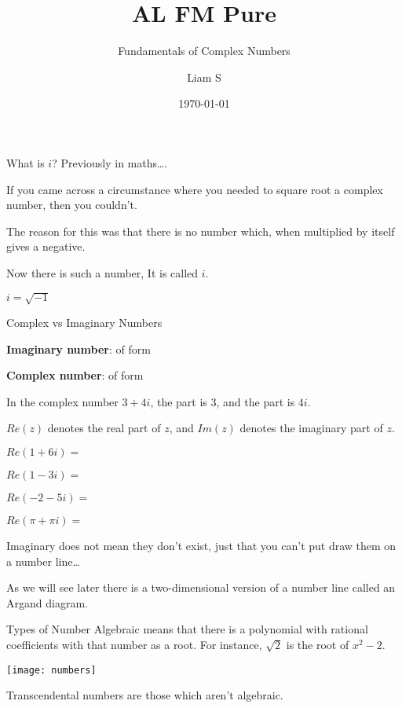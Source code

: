 \documentclass{beamer}
\title[Pure]{{\color{aa}\Huge\adfbullet{9}}AL FM Pure}
\subtitle{Fundamentals of Complex Numbers}
\author{Liam S}
\date{\today}
\begin{document}
	
	\setlength{\abovedisplayskip}{0pt}
	\setlength{\belowdisplayskip}{0pt}
	\setlength{\abovedisplayshortskip}{0pt}
	\setlength{\belowdisplayshortskip}{0pt}
	
	\frame{\titlepage}
	
	\begin{frame}[shrink=15]{What is $i$?}
	    Previously in maths….
    
        If you came across a circumstance where you needed to square root a complex number, then you couldn’t.
        
        The reason for this was that there is no number which, when multiplied by itself gives a negative.
        
        Now there is such a number, It is called $i$.
        
        \begin{definition}
            $i=\sqrt{-1}$
        \end{definition}
	\end{frame}
	
	\begin{frame}[shrink=15]{Complex vs Imaginary Numbers}
	    
	    \textbf{Imaginary number}: of form 
	    
	    \textbf{Complex number}: of form 
	    
	    In the complex number $3+4i$, the  part is $3$, and the  part is $4i$.
	    
	    \newline
	    
	    \begin{definition}
	        $Re(z)$ denotes the real part of $z$, and $Im(z)$ denotes the imaginary part of $z$.
	    \end{definition}

	    $Re(1+6i)=$ 

	    $Re(1-3i)=$ 

	    $Re(-2-5i)=$ 

	    $Re(\pi + \pi i)=$ \sol{$\pi$}
	    
	    Imaginary does not mean they don’t exist, just that you can’t put draw them on a number line…

        As we will see later there is a two-dimensional version of a number line called an Argand diagram.
	\end{frame}
	
	\begin{frame}[shrink=15]{Types of Number}
	    \alert<1>{Algebraic means that there is a polynomial with rational coefficients with that number as a root. For instance, $\sqrt{2}$ is the root of $x^2−2$.}

	    \texttt{[image: numbers]}
	    
	    \alert<1>{Transcendental numbers are those which aren’t algebraic.}
	\end{frame}
	
\end{document}
